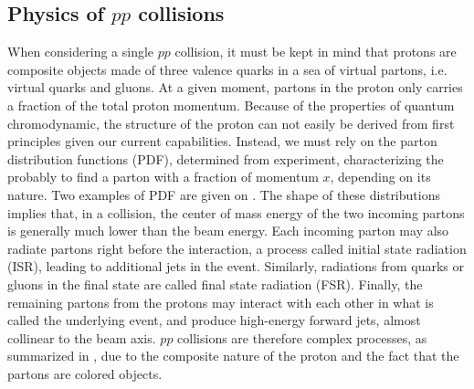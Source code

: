         \subsection{Physics of $pp$ collisions \label{sec:physicsFromCollisionsAtTheLHC}}

    When considering a single $pp$ collision, it must be kept in mind that protons are
    composite objects made of three valence quarks in a sea of virtual partons, i.e.
    virtual quarks and gluons. At a given moment, partons in the proton only carries a fraction
    of the total proton momentum. Because of the properties of quantum chromodynamic, the
    structure of the proton can not easily be derived from first principles given our current
    capabilities. Instead, we must rely on the parton distribution functions (PDF), determined
    from experiment, characterizing the probably to find a parton with a fraction of
    momentum $x$, depending on its nature. Two examples of PDF are given on
    . The shape of these
    distributions implies that, in a collision, the center of mass energy of the two incoming
    partons is generally much lower than the beam energy.  Each incoming parton may also
    radiate partons right before the interaction, a process called initial state radiation
    (ISR), leading to additional jets in the event. Similarly, radiations from quarks or
    gluons in the final state are called final state radiation (FSR). Finally, the remaining
    partons from the protons may interact with each other in what is called the underlying
    event, and produce high-energy forward jets, almost collinear to the beam axis. $pp$
    collisions are therefore complex processes, as summarized in ,
    due to the composite nature of the proton and the fact that the partons are colored
    objects.



